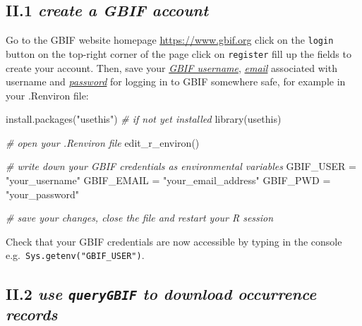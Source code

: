 \documentclass[
]{article}
\newenvironment{Shaded}{\begin{snugshade}}{\end{snugshade}}
\newcommand{\CommentTok}[1]{\textcolor[rgb]{0.56,0.35,0.01}{\textit{#1}}}
\newcommand{\FunctionTok}[1]{\textcolor[rgb]{0.00,0.00,0.00}{#1}}
\newcommand{\NormalTok}[1]{#1}
\newcommand{\OtherTok}[1]{\textcolor[rgb]{0.56,0.35,0.01}{#1}}
\newcommand{\StringTok}[1]{\textcolor[rgb]{0.31,0.60,0.02}{#1}}
\begin{document}
\hypertarget{ii.1-create-a-gbif-account}{%
\subsection{\texorpdfstring{II.1 \emph{create a GBIF
account}}{II.1 create a GBIF account}}\label{ii.1-create-a-gbif-account}}

Go to the GBIF website homepage
\href{https://www.gbif.org}{\underline{https://www.gbif.org}}
\rightarrow click on the \texttt{login} button on the top-right corner
of the page \rightarrow click on \texttt{register} \rightarrow fill up
the fields to create your account. Then, save your
\emph{\underline{GBIF username}}, \emph{\underline{email}} associated
with username and \emph{\underline{password}} for logging in to GBIF
somewhere safe, for example in your .Renviron file:

\begin{Shaded}
\begin{Highlighting}[]
\FunctionTok{install.packages}\NormalTok{(}\StringTok{"usethis"}\NormalTok{) }\CommentTok{\# if not yet installed}
\FunctionTok{library}\NormalTok{(usethis)}

\CommentTok{\# open your .Renviron file}
\FunctionTok{edit\_r\_environ}\NormalTok{()}

\CommentTok{\# write down your GBIF credentials as environmental variables}
\NormalTok{GBIF\_USER }\OtherTok{=} \StringTok{"your\_username"}
\NormalTok{GBIF\_EMAIL }\OtherTok{=} \StringTok{"your\_email\_address"}
\NormalTok{GBIF\_PWD }\OtherTok{=} \StringTok{"your\_password"}

\CommentTok{\# save your changes, close the file and restart your R session}
\end{Highlighting}
\end{Shaded}

Check that your GBIF credentials are now accessible by typing in the
console e.g.~\texttt{Sys.getenv("GBIF\_USER")}.

\hypertarget{ii.2-use-querygbif-to-download-occurrence-records}{%
\subsection{\texorpdfstring{II.2 \emph{use \texttt{queryGBIF} to
download occurrence
records}}{II.2 use queryGBIF to download occurrence records}}\label{ii.2-use-querygbif-to-download-occurrence-records}}
\end{document}
